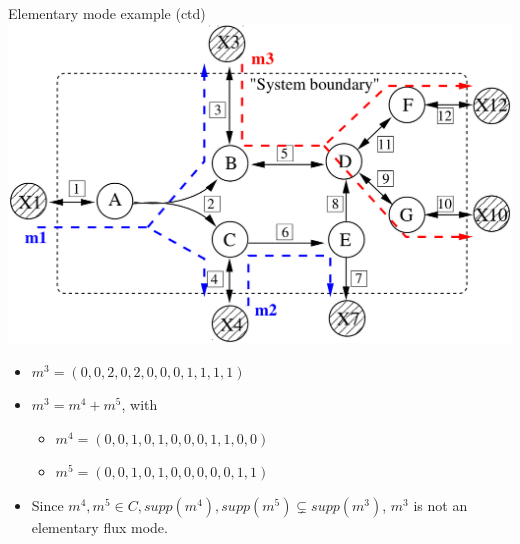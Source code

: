 \documentclass{beamer}
\begin{document}
\begin{frame}{Elementary mode example (ctd)}
    \includegraphics[width=.7\textwidth]{grafik/EMnet2}
    \begin{itemize}
        \item $m^{3} = (0, 0, 2, 0, 2, 0, 0, 0, 1, 1, 1 ,1)$
        \item $m^{3} = m^{4} + m^{5}$, with
        \begin{itemize}
            \item $ m^{4} = (0, 0, 1, 0, 1, 0, 0, 0, 1, 1, 0 ,0)$
            \item $ m^{5} = (0, 0, 1, 0, 1, 0, 0, 0, 0, 0, 1 ,1)$
        \end{itemize}
        \item Since $m^{4}, m^{5} \in C, supp(m^{4}), supp(m^{5}) \subsetneq supp(m^{3})$, $m^{3}$ is not an elementary flux mode.
    \end{itemize}
\end{frame}

\end{document}

